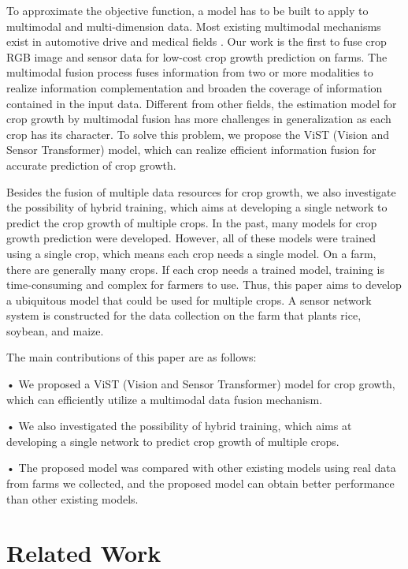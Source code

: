 \documentclass[acmsmall,manuscript, screen, review]{acmart}
\begin{document}
To approximate the objective function, a model has to be built to apply to multimodal and multi-dimension data. Most existing multimodal mechanisms exist in automotive drive and medical fields \cite{guo2019deep,xiao2020multimodal}. Our work is the first to fuse crop RGB image and sensor data for low-cost crop growth prediction on farms. The multimodal fusion process fuses information from two or more modalities to realize information complementation and broaden the coverage of information contained in the input data. Different from other fields, the estimation model for crop growth by multimodal fusion has more challenges in generalization as each crop has its character. To solve this problem, we propose the ViST (Vision and Sensor Transformer) model, which can realize efficient information fusion for accurate prediction of crop growth.

Besides the fusion of multiple data resources for crop growth, we also investigate the possibility of hybrid training, which aims at developing a single network to predict the crop growth of multiple crops. In the past, many models for crop growth prediction were developed. However, all of these models were trained using a single crop, which means each crop needs a single model. On a farm, there are generally many crops. If each crop needs a trained model, training is time-consuming and complex for farmers to use. Thus, this paper aims to develop a ubiquitous model that could be used for multiple crops. A sensor network system is constructed for the data collection on the farm that plants rice, soybean, and maize.

The main contributions of this paper are as follows:

•	We proposed a ViST (Vision and Sensor Transformer) model for crop growth, which can efficiently utilize a multimodal data fusion mechanism. 

•	We also investigated the possibility of hybrid training, which aims at developing a single network to predict crop growth of multiple crops.  

•	The proposed model was compared with other existing models using real data from farms we collected, and the proposed model can obtain better performance than other existing models.



\section{Related Work}
\end{document}
